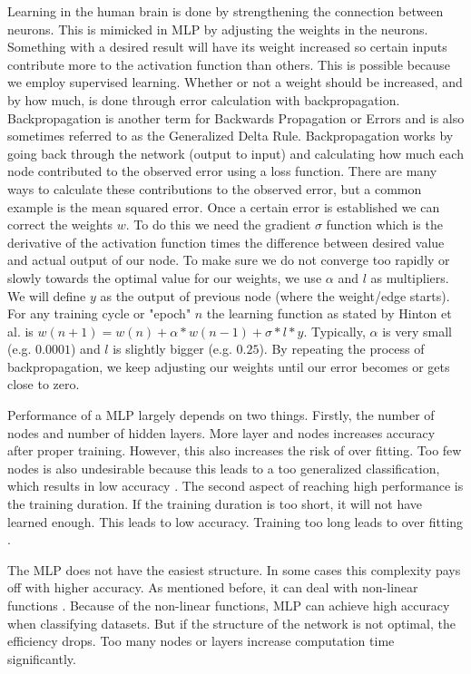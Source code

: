 Learning in the human brain is done by strengthening the connection between neurons. This is mimicked in MLP by adjusting the weights in the neurons. Something with a desired result will have its weight increased so certain inputs contribute more to the activation function than others. This is possible because we employ supervised learning. Whether or not a weight should be increased, and by how much, is done through error calculation with backpropagation. Backpropagation is another term for Backwards Propagation or Errors \cite{rumelhart1985learning} and is also sometimes referred to as the Generalized Delta Rule. Backpropagation works by going back through the network (output to input) and calculating how much each node contributed to the observed error using a loss function. There are many ways to calculate these contributions to the observed error, but a common example is the mean squared error. Once a certain error is established we can correct the weights $w$. To do this we need the gradient $\sigma$ function which is the derivative of the activation function times the difference between desired value and actual output of our node. To make sure we do not converge too rapidly or slowly towards the optimal value for our weights, we use $\alpha$ and $l$ as multipliers. We will define $y$ as the output of previous node (where the weight/edge starts). For any training cycle or "epoch" $n$ the learning function as stated by Hinton et al. is $w(n+1)=w(n) + \alpha * w(n-1) + \sigma * l * y$. Typically, $\alpha$ is very small (e.g. $0.0001$) and $l$ is slightly bigger (e.g. $0.25$). By repeating the process of backpropagation, we keep adjusting our weights until our error becomes or gets close to zero.

Performance of a MLP largely depends on two things. Firstly, the number of nodes and number of hidden layers. More layer and nodes increases accuracy after proper training. However, this also increases the risk of over fitting. Too few nodes is also undesirable because this leads to a too generalized classification, which results in low accuracy \cite{Murtagh1991183}. 
The second aspect of reaching high performance is the training duration. If the training duration is too short, it will not have learned enough. This leads to low accuracy. Training too long leads to over fitting \cite{caruana2001overfitting}. 

The MLP does not have the easiest structure. In some cases this complexity pays off with higher accuracy. As mentioned before, it can deal with non-linear functions \cite{gardner1998artificial}. Because of the non-linear functions, MLP can achieve high accuracy when classifying datasets. But if the structure of the network is not optimal, the efficiency drops. Too many nodes or layers increase computation time significantly.